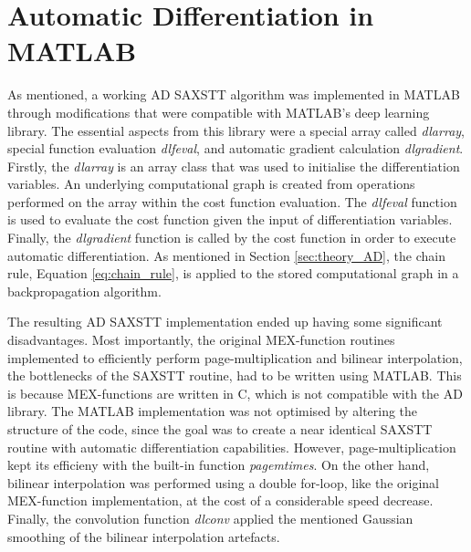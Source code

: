 \section{Automatic Differentiation in MATLAB}%
\label{sec:AD_matlab}
As mentioned,
a working AD SAXSTT algorithm was implemented  in MATLAB
through modifications that were compatible with MATLAB's deep learning library.
The essential aspects from this library were a special array called \emph{dlarray}, special function evaluation \emph{dlfeval}, and automatic gradient calculation \emph{dlgradient}.
Firstly, the \emph{dlarray} is an array class that was used to initialise the differentiation variables.
An underlying computational graph is created from operations performed on the array within the cost function evaluation.
The \emph{dlfeval} function is used to evaluate the cost function given the input of differentiation variables.
Finally, the \emph{dlgradient} function is called by the cost function in order to execute automatic differentiation.
As mentioned in Section \ref{sec:theory_AD}, the chain rule, Equation \eqref{eq:chain_rule}, is applied to the stored computational graph in a backpropagation algorithm.


The resulting AD SAXSTT implementation ended up having some significant disadvantages.
Most importantly, the original MEX-function routines implemented to efficiently perform page-multiplication and bilinear interpolation, the bottlenecks of the SAXSTT routine, had to be written using MATLAB.
This is because MEX-functions are written in C, which is not compatible with the AD library.
The MATLAB implementation was not optimised by altering the structure of the code, since the goal was to create a near identical SAXSTT routine with automatic differentiation capabilities.
However, page-multiplication kept its efficieny with the built-in function \emph{pagemtimes}.
On the other hand, bilinear interpolation was performed using a double for-loop, like the original MEX-function implementation, at the cost of a considerable speed decrease.
Finally, the convolution function \emph{dlconv} applied the mentioned Gaussian smoothing of the bilinear interpolation artefacts.


